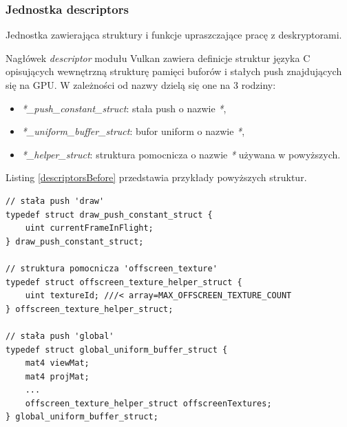 \subsubsection{Jednostka descriptors}
Jednostka zawierająca struktury i funkcje upraszczające pracę z deskryptorami.

Nagłówek \textit{descriptor} modułu Vulkan zawiera definicje struktur języka C opisujących wewnętrzną strukturę pamięci buforów i stałych push znajdujących się na GPU.
W zależności od nazwy dzielą się one na 3 rodziny:
\begin{itemize}
	\item \textit{*\_push\_constant\_struct}: stała push o nazwie \textit{*},
	\item \textit{*\_uniform\_buffer\_struct}: bufor uniform o nazwie \textit{*},
	\item \textit{*\_helper\_struct}: struktura pomocnicza o nazwie \textit{*} używana w powyższych.
\end{itemize}
Listing \ref{descriptorsBefore} przedstawia przykłady powyższych struktur.
\lstset{language=C}
\begin{lstlisting}[caption={Przykładowe struktury w nagłówku descriptor opisujące wewnętrzną strukturę deskryptorów},captionpos=b,label={descriptorsBefore}]
// stała push 'draw'
typedef struct draw_push_constant_struct {
	uint currentFrameInFlight;
} draw_push_constant_struct;

// struktura pomocnicza 'offscreen_texture'
typedef struct offscreen_texture_helper_struct {
	uint textureId; ///< array=MAX_OFFSCREEN_TEXTURE_COUNT
} offscreen_texture_helper_struct;

// stała push 'global'
typedef struct global_uniform_buffer_struct {
	mat4 viewMat;
	mat4 projMat;
	...
	offscreen_texture_helper_struct offscreenTextures;
} global_uniform_buffer_struct;
\end{lstlisting}

